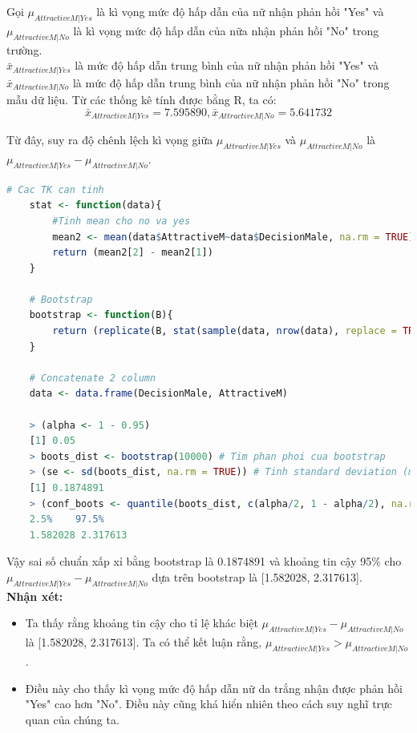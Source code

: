 \documentclass[a4paper,12pt]{article}
\begin{document}
	Gọi $\mu_{AttractiveM|Yes}$ là kì vọng mức độ hấp dẫn của nữ nhận phản hồi "Yes" và $\mu_{AttractiveM|No}$ là kì vọng mức độ hấp dẫn của nữa nhận phản hồi "No" trong trường.\\
	
	$\bar{x}_{AttractiveM|Yes}$ là mức độ hấp dẫn trung bình của nữ nhận phản hồi "Yes" và $\bar{x}_{AttractiveM|No}$ là mức độ hấp dẫn trung bình của nữ nhận phản hồi "No" trong mẫu dữ liệu. Từ các thống kê tính được bằng R, ta có:
	$$\bar{x}_{AttractiveM|Yes} = 7.595890, \bar{x}_{AttractiveM|No} = 5.641732$$
	
	Từ đây, suy ra độ chênh lệch kì vọng giữa $\mu_{AttractiveM|Yes}$ và $\mu_{AttractiveM|No}$ là $\mu_{AttractiveM|Yes} - \mu_{AttractiveM|No}$.
	
	\begin{lstlisting}[language=R]
	# Cac TK can tinh
	stat <- function(data){
		#Tinh mean cho no va yes
		mean2 <- mean(data$AttractiveM~data$DecisionMale, na.rm = TRUE)
		return (mean2[2] - mean2[1])
	}
	
	# Bootstrap
	bootstrap <- function(B){
		return (replicate(B, stat(sample(data, nrow(data), replace = TRUE))))
	}
	
	# Concatenate 2 column
	data <- data.frame(DecisionMale, AttractiveM)
	
	> (alpha <- 1 - 0.95)
	[1] 0.05
	> boots_dist <- bootstrap(10000) # Tim phan phoi cua bootstrap
	> (se <- sd(boots_dist, na.rm = TRUE)) # Tinh standard deviation (missing value se bi bo qua)
	[1] 0.1874891
	> (conf_boots <- quantile(boots_dist, c(alpha/2, 1 - alpha/2), na.rm = TRUE)) # Tim khoang tin cay cho mean
	2.5%    97.5% 
	1.582028 2.317613
	\end{lstlisting}
	Vậy sai số chuẩn xấp xỉ bằng bootstrap là 0.1874891 và khoảng tin cậy 95\% cho $\mu_{AttractiveM|Yes} - \mu_{AttractiveM|No}$ dựa trên bootstrap là [1.582028, 2.317613].\\
	
	\textbf{Nhận xét:}
	\begin{itemize}
		\item Ta thấy rằng khoảng tin cậy cho tỉ lệ khác biệt $\mu_{AttractiveM|Yes} - \mu_{AttractiveM|No}$ là [1.582028, 2.317613]. Ta có thể kết luận rằng, $\mu_{AttractiveM|Yes} > \mu_{AttractiveM|No} $.
		\item Điều này cho thấy kì vọng mức độ hấp dẫn nữ da trắng nhận được phản hồi "Yes" cao hơn "No". Điều này cũng khá hiển nhiên theo cách suy nghĩ trực quan của chúng ta.
	\end{itemize}
\end{document}
